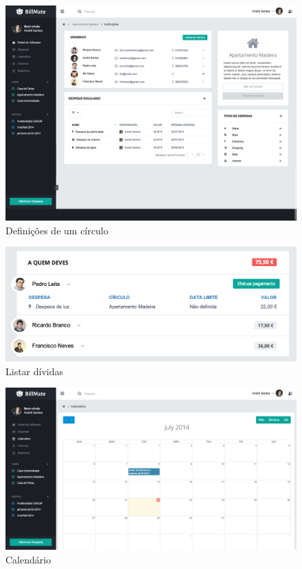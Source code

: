 \begin{figure}[H]
{
\includegraphics[width=.5\textwidth]{images/andre/settings_circle}
\caption{Definições de um círculo}
}
\end{figure}

\begin{figure}[H]
{
\includegraphics[width=.5\textwidth]{images/andre/dividas}
\caption{Listar dívidas}
}
\end{figure}

\begin{figure}[H]
\includegraphics[width=.5\textwidth]{images/andre/calendar}
\caption{Calendário}
\end{figure}

